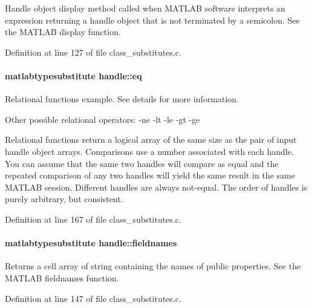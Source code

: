 Handle object display method called when M\+A\+T\+L\+AB software interprets an expression returning a handle object that is not terminated by a semicolon. See the M\+A\+T\+L\+AB display function. 



Definition at line 127 of file class\+\_\+substitutes.\+c.

\paragraph[{\texorpdfstring{eq}{eq}}]{\setlength{\rightskip}{0pt plus 5cm}matlabtypesubstitute handle\+::eq}\hypertarget{classhandle_a2fb018cd603a5ced1783bfb20c6cce86}{}\label{classhandle_a2fb018cd603a5ced1783bfb20c6cce86}


Relational functions example. See details for more information. 

\begin{DoxyParagraph}{Other possible relational operators\+:}
-\/ne -\/lt -\/le -\/gt -\/ge
\end{DoxyParagraph}
Relational functions return a logical array of the same size as the pair of input handle object arrays. Comparisons use a number associated with each handle. You can assume that the same two handles will compare as equal and the repeated comparison of any two handles will yield the same result in the same M\+A\+T\+L\+AB session. Different handles are always not-\/equal. The order of handles is purely arbitrary, but consistent. 

Definition at line 167 of file class\+\_\+substitutes.\+c.

\paragraph[{\texorpdfstring{fieldnames}{fieldnames}}]{\setlength{\rightskip}{0pt plus 5cm}matlabtypesubstitute handle\+::fieldnames}\hypertarget{classhandle_a7086577f3953d4bd9ce17b07c4f6e141}{}\label{classhandle_a7086577f3953d4bd9ce17b07c4f6e141}


Returns a cell array of string containing the names of public properties. See the M\+A\+T\+L\+AB fieldnames function. 



Definition at line 147 of file class\+\_\+substitutes.\+c.

